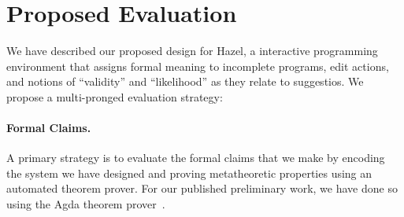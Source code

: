 \documentclass{purple}
\newcommand{\Hazel}[0]{\textsf{Hazel}\xspace}
\newcommand{\HazelEnv}[0]{\Hazel\xspace}
\begin{document}












\section{Proposed Evaluation}
\label{sec:eval}

We have described our proposed design for \HazelEnv, a interactive programming environment that assigns formal meaning  
to incomplete programs, edit actions, and notions of ``validity'' and
``likelihood'' as they relate to suggestios. We propose a multi-pronged evaluation
strategy: 

\paragraph{Formal Claims.} 
A primary strategy is to evaluate the formal claims that we make by encoding
the system we have designed and proving metatheoretic properties using an
automated theorem prover. For our published preliminary work, we have done so
using the Agda theorem prover~\cite{norell2009dependently}.
\end{document}
